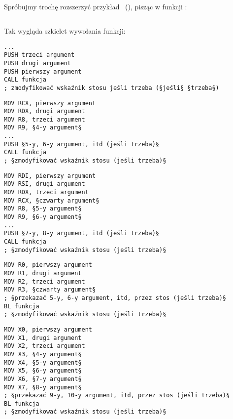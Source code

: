 \mysection{\PrintfSeveralArgumentsSectionName}

Spróbujmy trochę rozszerzyć przykład \emph{\HelloWorldSectionName}~(),
pisząc w funkcji \main:







\subsection{\Conclusion{}}

Tak wygląda szkielet wywołania funkcji:

\begin{lstlisting}[caption=x86,style=customasmx86]
...
PUSH trzeci argument 
PUSH drugi argument
PUSH pierwszy argument
CALL funkcja
; zmodyfikować wskaźnik stosu jeśli trzeba (§jeśli§ §trzeba§)
\end{lstlisting}

\begin{lstlisting}[caption=x64 (MSVC),style=customasmx86]
MOV RCX, pierwszy argument
MOV RDX, drugi argument
MOV R8, trzeci argument
MOV R9, §4-y argument§
...
PUSH §5-y, 6-y argument, itd (jeśli trzeba)§
CALL funkcja
; §zmodyfikować wskaźnik stosu (jeśli trzeba)§
\end{lstlisting}

\begin{lstlisting}[caption=x64 (GCC),style=customasmx86]
MOV RDI, pierwszy argument
MOV RSI, drugi argument
MOV RDX, trzeci argument
MOV RCX, §czwarty argument§
MOV R8, §5-y argument§
MOV R9, §6-y argument§
...
PUSH §7-y, 8-y argument, itd (jeśli trzeba)§
CALL funkcja
; §zmodyfikować wskaźnik stosu (jeśli trzeba)§
\end{lstlisting}

\begin{lstlisting}[caption=ARM,style=customasmARM]
MOV R0, pierwszy argument
MOV R1, drugi argument
MOV R2, trzeci argument
MOV R3, §czwarty argument§
; §przekazać 5-y, 6-y argument, itd, przez stos (jeśli trzeba)§
BL funkcja
; §zmodyfikować wskaźnik stosu (jeśli trzeba)§
\end{lstlisting}

\begin{lstlisting}[caption=ARM64,style=customasmARM]
MOV X0, pierwszy argument
MOV X1, drugi argument
MOV X2, trzeci argument
MOV X3, §4-y argument§
MOV X4, §5-y argument§
MOV X5, §6-y argument§
MOV X6, §7-y argument§
MOV X7, §8-y argument§
; §przekazać 9-y, 10-y argument, itd, przez stos (jeśli trzeba)§
BL funkcja
; §zmodyfikować wskaźnik stosu (jeśli trzeba)§
\end{lstlisting}

